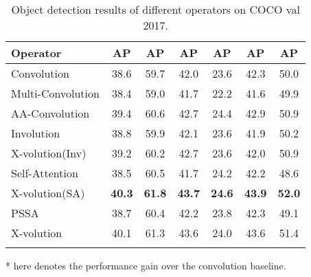 \documentclass{article}
\newcommand{\cgap}[2]{
	\fontsize{6pt}{1em}\selectfont{({#2})}
}
\newcommand{\apbbox}[1]{AP}
\begin{document}
\begin{table*}[t]\centering
 \caption{Object detection results of different operators on COCO val 2017.}
 \label{tab_det}
 \begin{spacing}{1.2}
 \small
\setlength\tabcolsep{6.4pt}
 \begin{threeparttable}
 \begin{tabular}{l|c|c|c|c|c|c}
        \Xhline{1.1pt}
        Operator
		& \fontsize{8pt}{1em}\selectfont \quad\apbbox{~}
		& \fontsize{8pt}{1em}\selectfont \quad\apbbox{50}
		& \fontsize{8pt}{1em}\selectfont \quad\apbbox{75}
		& \fontsize{8pt}{1em}\selectfont \quad\apbbox{S}
		& \fontsize{8pt}{1em}\selectfont \quad\apbbox{M}
		& \fontsize{8pt}{1em}\selectfont \quad\apbbox{L} \\ \hline

		Convolution & 38.6 & 59.7 & 42.0 & 23.6 & 42.3 & 50.0 \\ 
		Multi-Convolution & 38.4\cgap{-}{0.2}  & 59.0\cgap{-}{0.7}  & 41.7\cgap{-}{0.3}  & 22.2\cgap{-}{1.4} & 41.6\cgap{-}{0.7} &  49.9\cgap{-}{0.1} \\
		AA-Convolution~\cite{DBLP:conf/iccv/BelloZLVS19}
		& 39.4\cgap{+}{0.8}  & 60.6\cgap{+}{0.9}  & 42.7\cgap{+}{0.7}  & 24.4\cgap{+}{0.8} &  42.9\cgap{+}{0.6} &  50.9\cgap{+}{0.9} \\ 
	
		\cline{1-7}
		
		Involution~\cite{DBLP:journals/corr/abs-2103-06255}
		& 38.8\cgap{+}{0.2} & 59.9\cgap{+}{0.2} & 42.1\cgap{+}{0.1} & 23.6\cgap{+}{0.0} & 41.9\cgap{-}{0.4} & 50.2\cgap{+}{0.2} \\ 
		X-volution(Inv) & 39.2\cgap{+}{0.6} & 60.2\cgap{+}{0.5} & 42.7\cgap{+}{0.7} & 23.6\cgap{+}{0.0} & 42.0\cgap{-}{0.3} & 
		50.9\cgap{+}{0.9}\\ \cline{1-7}
		
		Self-Attention~\cite{DBLP:conf/nips/VaswaniSPUJGKP17}
		&  38.5\cgap{-}{0.1} & 60.5\cgap{+}{0.8}  & 41.7\cgap{-}{0.3}  & 24.2\cgap{+}{0.6}  &  42.2\cgap{-}{0.1} & 48.6\cgap{-}{1.4}  \\ 
		X-volution(SA)& \textbf{40.3}\cgap{+}{1.7} & \textbf{61.8}\cgap{+}{2.1} & \textbf{43.7}\cgap{+}{1.7} & \textbf{24.6}\cgap{+}{1.0} & \textbf{43.9}\cgap{+}{1.6} & \textbf{52.0}\cgap{+}{2.0} \\
		\cline{1-7}
		
		PSSA & 38.7\cgap{+}{0.1} & 60.4\cgap{+}{0.7} & 42.2\cgap{+}{0.2} & 23.8\cgap{+}{0.2} & 42.3\cgap{+}{0.0} & 49.1\cgap{-}{0.9} \\ 
		X-volution & 40.1\cgap{+}{1.5} & 61.3\cgap{+}{1.6} & 43.6\cgap{+}{1.6} & 24.0\cgap{+}{0.4} & 43.6\cgap{+}{1.3} & 51.4\cgap{+}{1.4} \\
		\Xhline{1.0pt}
		
\end{tabular}
	\begin{tablenotes}
\footnotesize
    \item[*]  here denotes the performance gain over the convolution baseline.
	\end{tablenotes}
\vspace{-3mm}
\end{threeparttable}
\end{spacing}
\end{table*}
\end{document}
